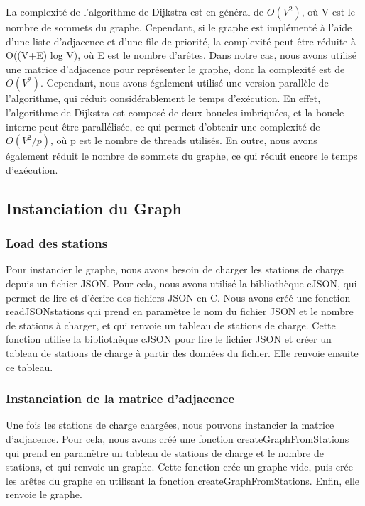 \documentclass[french,a4paper]{article}
\begin{document}
La complexité de l'algorithme de Dijkstra est en général de $O(V^2)$, où V est le nombre de sommets du graphe. Cependant, si le graphe est implémenté à l'aide d'une liste d'adjacence et d'une file de priorité, la complexité peut être réduite à O((V+E) log V), où E est le nombre d'arêtes. Dans notre cas, nous avons utilisé une matrice d'adjacence pour représenter le graphe, donc la complexité est de $O(V^2)$. Cependant, nous avons également utilisé une version parallèle de l'algorithme, qui réduit considérablement le temps d'exécution. En effet, l'algorithme de Dijkstra est composé de deux boucles imbriquées, et la boucle interne peut être parallélisée, ce qui permet d'obtenir une complexité de $O(V^2/p)$, où p est le nombre de threads utilisés. En outre, nous avons également réduit le nombre de sommets du graphe, ce qui réduit encore le temps d'exécution.

\subsection{Instanciation du Graph}

\subsubsection{Load des stations}
Pour instancier le graphe, nous avons besoin de charger les stations de charge depuis un fichier JSON. Pour cela, nous avons utilisé la bibliothèque cJSON, qui permet de lire et d'écrire des fichiers JSON en C. Nous avons créé une fonction readJSONstations qui prend en paramètre le nom du fichier JSON et le nombre de stations à charger, et qui renvoie un tableau de stations de charge. Cette fonction utilise la bibliothèque cJSON pour lire le fichier JSON et créer un tableau de stations de charge à partir des données du fichier. Elle renvoie ensuite ce tableau.

\subsubsection{Instanciation de la matrice d'adjacence}
Une fois les stations de charge chargées, nous pouvons instancier la matrice d'adjacence. Pour cela, nous avons créé une fonction createGraphFromStations qui prend en paramètre un tableau de stations de charge et le nombre de stations, et qui renvoie un graphe. Cette fonction crée un graphe vide, puis crée les arêtes du graphe en utilisant la fonction createGraphFromStations. Enfin, elle renvoie le graphe.
\end{document}
